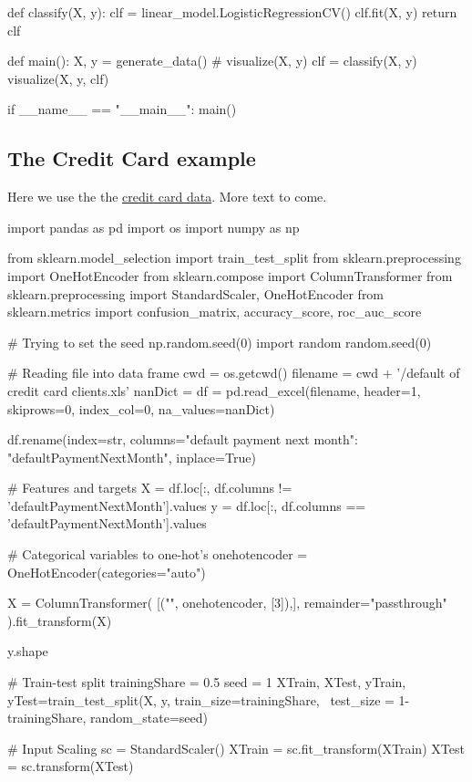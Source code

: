 \documentclass[%
oneside,                 %
final,                   %
10pt]{article}
\begin{document}
def classify(X, y):
    clf = linear_model.LogisticRegressionCV()
    clf.fit(X, y)
    return clf


def main():
    X, y = generate_data()
    # visualize(X, y)
    clf = classify(X, y)
    visualize(X, y, clf)

if __name__ == "__main__":
    main()
\epycod



\subsection{The Credit Card example}
Here we use the the \href{{https://archive.ics.uci.edu/ml/datasets/default+of+credit+card+clients}}{credit card data}. More text to come.

\bpycod
import pandas as pd
import os
import numpy as np


from sklearn.model_selection import train_test_split
from sklearn.preprocessing import OneHotEncoder
from sklearn.compose import ColumnTransformer
from sklearn.preprocessing import StandardScaler, OneHotEncoder
from sklearn.metrics import confusion_matrix, accuracy_score, roc_auc_score

# Trying to set the seed
np.random.seed(0)
import random
random.seed(0)

# Reading file into data frame
cwd = os.getcwd()
filename = cwd + '/default of credit card clients.xls'
nanDict = {}
df = pd.read_excel(filename, header=1, skiprows=0, index_col=0, na_values=nanDict)

df.rename(index=str, columns={"default payment next month": "defaultPaymentNextMonth"}, inplace=True)

# Features and targets 
X = df.loc[:, df.columns != 'defaultPaymentNextMonth'].values
y = df.loc[:, df.columns == 'defaultPaymentNextMonth'].values

# Categorical variables to one-hot's
onehotencoder = OneHotEncoder(categories="auto")

X = ColumnTransformer(
    [("", onehotencoder, [3]),],
    remainder="passthrough"
).fit_transform(X)

y.shape

# Train-test split
trainingShare = 0.5 
seed  = 1
XTrain, XTest, yTrain, yTest=train_test_split(X, y, train_size=trainingShare, \
                                              test_size = 1-trainingShare,
                                             random_state=seed)

# Input Scaling
sc = StandardScaler()
XTrain = sc.fit_transform(XTrain)
XTest = sc.transform(XTest)
\end{document}
